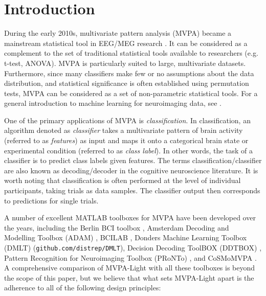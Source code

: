\documentclass[utf8]{frontiersSCNS} %
\begin{document}
\section{Introduction}

During the early 2010s, multivariate pattern analysis (MVPA) became a mainstream statistical tool in EEG/MEG research \citep{Lemm2011,Grootswagers2017DecodingData}. It can be considered as a complement to the set of traditional statistical tools available to researchers (e.g. t-test, ANOVA). MVPA is particularly suited to large, multivariate datasets. Furthermore, since many classifiers make few or no assumptions about the data distribution, and statistical significance is often established using permutation tests, MVPA can be considered as a set of non-parametric statistical tools. For a general introduction to machine learning for neuroimaging data, see \cite{Blankertz2011,Lemm2011,Mur2009,Grootswagers2017DecodingData,King2014}.

One of the primary applications of MVPA is \textit{classification}. In classification, an algorithm denoted as \textit{classifier} takes a multivariate pattern of brain activity (referred to as \textit{features}) as input and maps it onto a categorical brain state or experimental condition (referred to as \textit{class label}). In other words, the task of a classifier is to predict class labels given features. The terms classification/classifier are also known as decoding/decoder in the cognitive neuroscience literature. It is worth noting that classification is often performed at the level of individual participants, taking trials as data samples. The classifier output then corresponds to predictions for single trials. 

A number of excellent MATLAB toolboxes for MVPA have been developed over the years, including the Berlin BCI toolbox \citep{Blankertz2016TheControl}, Amsterdam Decoding and Modelling Toolbox (ADAM) \citep{Fahrenfort2018FromADAM}, BCILAB \citep{Kothe2013BCILAB:Development}, Donders Machine Learning Toolbox (DMLT) (\texttt{github.com/distrep/DMLT}), Decision Decoding ToolBOX (DDTBOX) \citep{Bode2019ThePotentials}, Pattern Recognition for Neuroimaging Toolbox (PRoNTo) \citep{Schrouff2013PRoNTo:Toolbox}, and CoSMoMVPA \citep{Oosterhof2016CoSMoMVPA:Octave}. A comprehensive comparison of MVPA-Light with all these toolboxes is beyond the scope of this paper, but we believe that what sets MVPA-Light apart is the adherence to all of the following design principles: 
\end{document}
